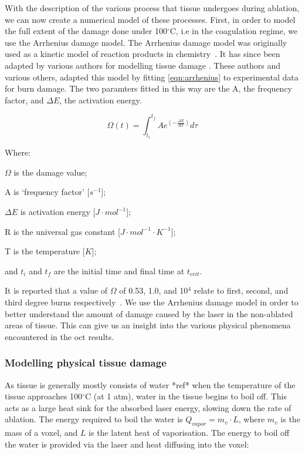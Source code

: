 With the description of the various process that tissue undergoes during ablation, we can now create a numerical model of these processes.
First, in order to model the full extent of the damage done under 100${^{\circ}}$C, i.e in the coagulation regime, we use the Arrhenius damage model. The Arrhenius damage model was originally used as a kinetic model of reaction products in chemistry~\cite{pearce2009relationship}. It has since been adapted by various authors for modelling tissue damage \cite{hendriques1947studies,jiang2002effects}. These authors and various others, adapted this model by fitting \cref{eqn:arrhenius} to experimental data for burn damage. The two paramters fitted in this way are the A, the frequency factor, and $\Delta E$, the activation energy.

\begin{equation}
\Omega(t)=\int^{t_{f}}_{t_i} Ae^{(-\tfrac{\Delta E}{RT})}d\tau
\label{eqn:arrhenius}
\end{equation}


\noindent Where:

	\indent $\Omega$ is the damage value;
	
	\indent A is `frequency factor' [$s^{-1}$];
	
	\indent $\Delta E$ is activation energy [$J\cdot mol^{-1}$];
	
	\indent R is the universal gas constant [$J\cdot mol^{-1}\cdot K^{-1}$];
	
	\indent T is the temperature [$K$];
	
	\indent and $t_i$ and $t_f$ are the initial time and final time at $t_{crit}$.
	
	\medskip

It is reported that a value of $\Omega$ of 0.53, 1.0, and 10$^4$ relate to first, second, and third degree burns respectively~\cite{diller1983finite}. We use the Arrhenius damage model in order to better understand the amount of damage caused by the laser in the non-ablated areas of tissue. This can give us an insight into the various physical phenomena encountered in the \gls{oct} results.

\subsubsection{Modelling physical tissue damage}

As tissue is generally mostly consists of water *ref* when the temperature of the tissue approaches 100$^{\circ}$C (at 1 atm), water in the tissue begins to boil off. This acts as a large heat sink for the absorbed laser energy, slowing down the rate of ablation. The energy required to boil the water is $Q_{vapor}=m_v\cdot L$, where $m_v$ is the mass of a voxel, and $L$ is the latent heat of vaporisation. The energy to boil off the water is provided via the laser and heat diffusing into the voxel:

